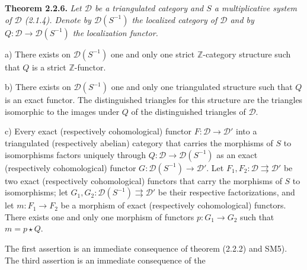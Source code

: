 \smallskip
\noindent\textbf{Theorem 2.2.6.}\quad
\begingroup\itshape
{}%
Let $\mathcal D$ be a triangulated category and $S$ a multiplicative system
of $\mathcal D$ (2.1.4). Denote by $\mathcal D(S^{-1})$ the localized
category of $\mathcal D$ and by
$Q\colon\mathcal D\longrightarrow\mathcal D(S^{-1})$ the localization
functor.

\par\noindent a) There exists on $\mathcal D(S^{-1})$ one and only one strict
$\mathbb Z$-category structure such that $Q$ is a strict $\mathbb Z$-functor.

\par\noindent b) There exists on $\mathcal D(S^{-1})$ one and only one
triangulated structure such that $Q$ is an exact functor. The distinguished
triangles for this structure are the triangles isomorphic to the images
under $Q$ of the distinguished triangles of $\mathcal D$.

\par\noindent c) Every exact (respectively cohomological) functor
$F\colon\mathcal D\longrightarrow\mathcal D'$ into a triangulated
(respectively abelian) category that carries the morphisms of $S$ to
isomorphisms factors uniquely through
$Q\colon\mathcal D\longrightarrow\mathcal D(S^{-1})$ as an exact
(respectively cohomological) functor
$G\colon\mathcal D(S^{-1})\longrightarrow\mathcal D'$.
%
Let $F_1,F_2\colon\mathcal D\rightrightarrows\mathcal D'$ be two exact
(respectively cohomological) functors that carry the morphisms of $S$ to
isomorphisms; let
$G_1,G_2\colon\mathcal D(S^{-1})\rightrightarrows\mathcal D'$ be their
respective factorizations, and let
$m\colon F_1\longrightarrow F_2$ be a morphism of exact (respectively
cohomological) functors. There exists one and only one morphism of functors
$p\colon G_1\longrightarrow G_2$ such that $m=p\star Q$.
\endgroup

\par\noindent The first assertion is an immediate consequence of theorem
(2.2.2) and SM5).
%
The third assertion is an immediate consequence of the

\endgroup
